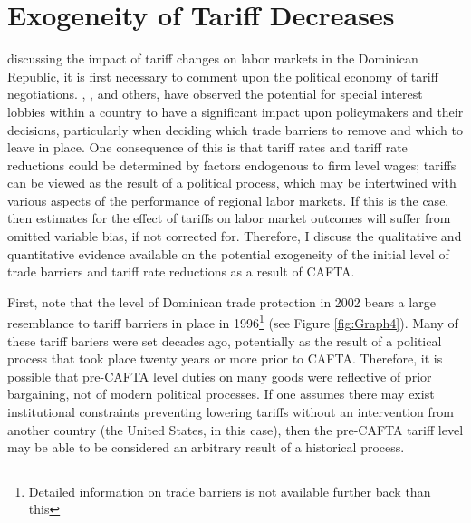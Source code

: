\chapter{Exogeneity of Tariff Decreases}
\label{sec:Exogeneity}

 discussing the impact of tariff changes on labor markets in
the Dominican Republic, it is first necessary to comment upon the political economy of
tariff negotiations. \citet{grossman}, \citet{brock1978}, \citet{maggi2007political} and others, 
have observed the potential for special interest lobbies within a country to have a significant 
impact upon policymakers and their decisions, particularly when deciding which trade barriers to 
remove and which to leave in place. One consequence of this is that 
tariff rates and tariff rate reductions could be determined by factors endogenous to firm level
wages; tariffs can be viewed as the result of a political process, which may be intertwined with 
various aspects of the performance of regional labor markets. If this is the case, then estimates 
for the effect of tariffs on labor market outcomes will suffer from omitted variable bias, if not
corrected for. Therefore, I discuss the qualitative and
quantitative evidence available on the potential exogeneity of the initial level of
trade barriers and tariff rate reductions as a result of CAFTA. 

First, note that the level of Dominican trade protection in 2002 bears a large resemblance
to tariff barriers in place in 1996\footnote{Detailed
information on trade barriers is not available further back than this} (see Figure \ref{fig:Graph4}).
Many of these tariff bariers were set decades ago, potentially as the result of a political process
that took place twenty years or more prior to CAFTA. Therefore, it is possible that pre-CAFTA level 
duties on many goods were reflective of prior bargaining, not of modern political processes.
If one assumes there may exist institutional constraints preventing lowering tariffs without an 
intervention from another country (the United States, in this case), then the pre-CAFTA tariff
level may be able to be considered an arbitrary result of a historical process. 

